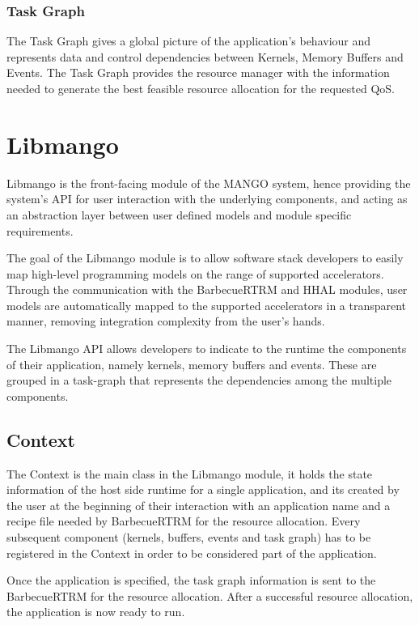 \subsubsection{Task Graph}

The Task Graph gives a global picture of the application's behaviour and represents data and control dependencies between Kernels, Memory Buffers and Events. The Task Graph provides the resource manager with the information needed to generate the best feasible resource allocation for the requested QoS. \cite{mango_exploring_manycore_architectures}


\section{Libmango}
Libmango is the front-facing module of the MANGO system, hence providing the system's API for user interaction with the underlying components, and acting as an abstraction layer between user defined models and module specific requirements.

The goal of the Libmango module is to allow software stack developers to easily map high-level programming models on the range of supported accelerators. Through the communication with the BarbecueRTRM and HHAL modules, user models are automatically mapped to the supported accelerators in a transparent manner, removing integration complexity from the user's hands.

The Libmango API allows developers to indicate to the runtime the components of their application, namely kernels, memory buffers and events. These are grouped in a task-graph that represents the dependencies among the multiple components. 

\subsection{Context}
The Context is the main class in the Libmango module, it holds the state information of the host side runtime for a single application, and its created by the user at the beginning of their interaction with an application name and a recipe file needed by BarbecueRTRM for the resource allocation. Every subsequent component (kernels, buffers, events and task graph) has to be registered in the Context in order to be considered part of the application.

Once the application is specified, the task graph information is sent to the BarbecueRTRM for the resource allocation. After a successful resource allocation, the application is now ready to run.


